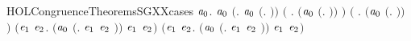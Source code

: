 \begin{SaveVerbatim}{HOLCongruenceTheoremsSGXXcases}
\HOLTokenTurnstile{} \HOLSymConst{\HOLTokenForall{}}\ensuremath{\HOLBoundVar{a}\sb{\mathrm{0}}}.
        \ensuremath{\HOLBoundVar{a}\sb{\mathrm{0}}} \HOLSymConst{\HOLTokenEquiv{}}
       \ensuremath{(}\HOLSymConst{\HOLTokenExists{}}. \ensuremath{\HOLBoundVar{a}\sb{\mathrm{0}}} \HOLSymConst{\ensuremath{=}} \ensuremath{(}\HOLTokenLambda{}. \ensuremath{)}\ensuremath{)} \HOLSymConst{\HOLTokenDisj{}}
       \ensuremath{(}\HOLSymConst{\HOLTokenExists{}} . \ensuremath{(}\ensuremath{\HOLBoundVar{a}\sb{\mathrm{0}}} \HOLSymConst{\ensuremath{=}} \ensuremath{(}\HOLTokenLambda{}.  \HOLSymConst{\ensuremath{\ldotp}} \ensuremath{)}\ensuremath{)} \HOLSymConst{\HOLTokenConj{}}  \ensuremath{)} \HOLSymConst{\HOLTokenDisj{}}
       \ensuremath{(}\HOLSymConst{\HOLTokenExists{}} . \ensuremath{(}\ensuremath{\HOLBoundVar{a}\sb{\mathrm{0}}} \HOLSymConst{\ensuremath{=}} \ensuremath{(}\HOLTokenLambda{}. \HOLSymConst{\ensuremath{\ldotp}} \ensuremath{)}\ensuremath{)} \HOLSymConst{\HOLTokenConj{}}  \ensuremath{)} \HOLSymConst{\HOLTokenDisj{}}
       \ensuremath{(}\HOLSymConst{\HOLTokenExists{}}\ensuremath{\HOLBoundVar{e}\sb{\mathrm{1}}} \ensuremath{\HOLBoundVar{e}\sb{\mathrm{2}}}. \ensuremath{(}\ensuremath{\HOLBoundVar{a}\sb{\mathrm{0}}} \HOLSymConst{\ensuremath{=}} \ensuremath{(}\HOLTokenLambda{}. \ensuremath{\HOLBoundVar{e}\sb{\mathrm{1}}}  \HOLSymConst{\ensuremath{+}} \ensuremath{\HOLBoundVar{e}\sb{\mathrm{2}}} \ensuremath{)}\ensuremath{)} \HOLSymConst{\HOLTokenConj{}}  \ensuremath{\HOLBoundVar{e}\sb{\mathrm{1}}} \HOLSymConst{\HOLTokenConj{}}  \ensuremath{\HOLBoundVar{e}\sb{\mathrm{2}}}\ensuremath{)} \HOLSymConst{\HOLTokenDisj{}}
       \ensuremath{(}\HOLSymConst{\HOLTokenExists{}}\ensuremath{\HOLBoundVar{e}\sb{\mathrm{1}}} \ensuremath{\HOLBoundVar{e}\sb{\mathrm{2}}}. \ensuremath{(}\ensuremath{\HOLBoundVar{a}\sb{\mathrm{0}}} \HOLSymConst{\ensuremath{=}} \ensuremath{(}\HOLTokenLambda{}. \ensuremath{\HOLBoundVar{e}\sb{\mathrm{1}}}  \HOLSymConst{\ensuremath{\mid}} \ensuremath{\HOLBoundVar{e}\sb{\mathrm{2}}} \ensuremath{)}\ensuremath{)} \HOLSymConst{\HOLTokenConj{}}  \ensuremath{\HOLBoundVar{e}\sb{\mathrm{1}}} \HOLSymConst{\HOLTokenConj{}}  \ensuremath{\HOLBoundVar{e}\sb{\mathrm{2}}}\ensuremath{)} \HOLSymConst{\HOLTokenDisj{}}

\end{SaveVerbatim}
